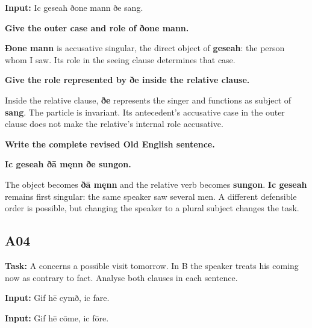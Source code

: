 \textbf{Input:} Ic geseah ðone mann ðe sang.

\textbf{Give the outer case and role of ðone mann.}

\textbf{Ðone mann} is accusative singular, the direct object of \textbf{geseah}: the person whom I saw. Its role in the seeing clause determines that case.

\textbf{Give the role represented by ðe inside the relative clause.}

Inside the relative clause, \textbf{ðe} represents the singer and functions as subject of \textbf{sang}. The particle is invariant. Its antecedent's accusative case in the outer clause does not make the relative's internal role accusative.

\textbf{Write the complete revised Old English sentence.}

\textbf{Ic geseah ðā męnn ðe sungon.}

The object becomes \textbf{ðā męnn} and the relative verb becomes \textbf{sungon}. \textbf{Ic geseah} remains first singular: the same speaker saw several men. A different defensible order is possible, but changing the speaker to a plural subject changes the task.

\subsection*{A04}

\textbf{Task:} A concerns a possible visit tomorrow. In B the speaker treats his coming now as contrary to fact. Analyse both clauses in each sentence.

\textbf{Input:} Gif hē cymð, ic fare.

\textbf{Input:} Gif hē cōme, ic fōre.

